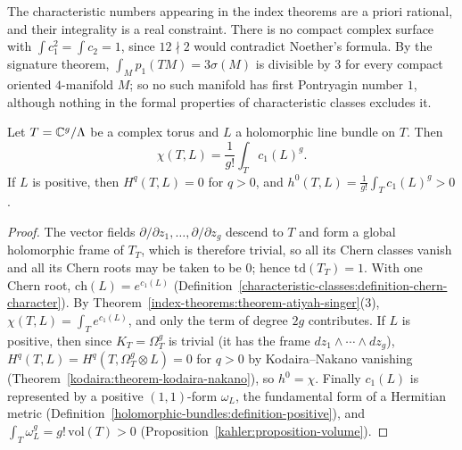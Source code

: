 \begin{counterexample}\label{index-theorems:counterexample-integrality}
The characteristic numbers appearing in the index theorems are a priori rational, and their integrality is a real constraint. There is no compact complex surface with $\int c_1^2 = \int c_2 = 1$, since $12 \nmid 2$ would contradict
Noether's formula. By the signature theorem, $\int_Mp_1(TM) = 3\sigma(M)$ is divisible by $3$ for every compact oriented $4$-manifold $M$; so no such manifold has first Pontryagin number $1$, although nothing in the formal properties
of characteristic classes excludes it.
\end{counterexample}

\begin{proposition}\label{index-theorems:proposition-rr-tori}
Let $T = \mathbb{C}^g/\Lambda$ be a complex torus and $L$ a holomorphic line bundle on $T$. Then
\[
\chi(T, L) = \frac{1}{g!}\int_Tc_1(L)^g .
\]
If $L$ is positive, then $H^q(T, L) = 0$ for $q > 0$, and $h^0(T, L) = \frac{1}{g!}\int_Tc_1(L)^g > 0$.
\end{proposition}

\begin{proof}
The vector fields $\partial/\partial z_1, \ldots, \partial/\partial z_g$ descend to $T$ and form a global holomorphic frame of $T_T$, which is therefore trivial, so all its Chern classes vanish and all its Chern roots may be taken
to be $0$; hence $\mathrm{td}(T_T) = 1$. With one Chern root, $\mathrm{ch}(L) = e^{c_1(L)}$ (Definition~\ref{characteristic-classes:definition-chern-character}). By
Theorem~\ref{index-theorems:theorem-atiyah-singer}(3), $\chi(T, L) = \int_Te^{c_1(L)}$, and only the term of degree $2g$ contributes. If $L$ is positive, then since $K_T = \Omega^g_T$ is trivial (it has the frame
$dz_1 \wedge \cdots \wedge dz_g$), $H^q(T, L) = H^q(T, \Omega^g_T \otimes L) = 0$ for $q > 0$ by Kodaira--Nakano vanishing (Theorem~\ref{kodaira:theorem-kodaira-nakano}), so $h^0 = \chi$. Finally $c_1(L)$ is
represented by a positive $(1,1)$-form $\omega_L$, the fundamental form of a Hermitian metric (Definition~\ref{holomorphic-bundles:definition-positive}), and $\int_T\omega_L^g = g!\,\mathrm{vol}(T) > 0$
(Proposition~\ref{kahler:proposition-volume}).
\end{proof}


